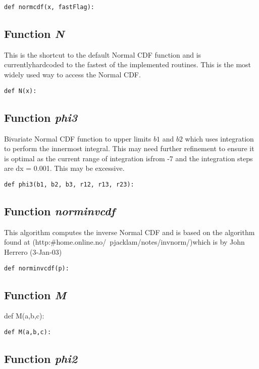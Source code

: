\documentclass[twoside,11pt]{book}
\begin{document}
\begin{lstlisting}
def normcdf(x, fastFlag):
\end{lstlisting}

\subsection{Function {\it N}}
This is the shortcut to the default Normal CDF function and is currentlyhardcoded to the fastest of the implemented routines. This is the most widely used way to access the Normal CDF. 

\begin{lstlisting}
def N(x):
\end{lstlisting}

\subsection{Function {\it phi3}}
Bivariate Normal CDF function to upper limits $b1$ and $b2$ which uses integration to perform the innermost integral. This may need further refinement to ensure it is optimal as the current range of integration isfrom -7 and the integration steps are dx = 0.001. This may be excessive. 

\begin{lstlisting}
def phi3(b1, b2, b3, r12, r13, r23):
\end{lstlisting}

\subsection{Function {\it norminvcdf}}
This algorithm computes the inverse Normal CDF and is based on the algorithm found at (http:\#home.online.no/~pjacklam/notes/invnorm/)which is by John Herrero (3-Jan-03) 

\begin{lstlisting}
def norminvcdf(p):
\end{lstlisting}

\subsection{Function {\it M}}
def M(a,b,c):

\begin{lstlisting}
def M(a,b,c):
\end{lstlisting}

\subsection{Function {\it phi2}}
\end{document}
